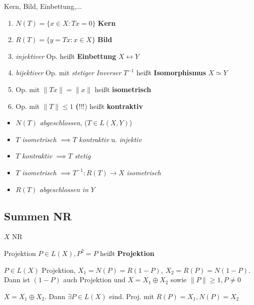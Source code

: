 \begin{definition}{Kern, Bild, Einbettung,...}
  \begin{enumerate}[label = (\roman*)]
    \item $N(T) = \{x \in X: Tx =0\}$ \textbf{Kern}
    \item $R(T) = \{y = Tx: x \in X\}$ \textbf{Bild}
    \item \textit{injektiver} Op. heißt \textbf{Einbettung}
      $X \leftrightarrow Y$
    \item \textit{bijektiver} Op. mit \textit{stetiger Inverser} $T^{-1}$
     heißt \textbf{Isomorphismus} $X \simeq Y$
    \item Op. mit $\|Tx\| = \|x\|$ heißt \textbf{isometrisch}
    \item Op. mit $\|T\| \leq 1$ \textbf(!!!) heißt \textbf{kontraktiv}
  \end{enumerate}
\end{definition}

\begin{bemerkung}
  \begin{itemize}
    \item $N(T)$ \textit{abgeschlossen}, ($T\in L(X,Y)$)
    \item $T$ \textit{isometrisch} $\implies T$ \textit{kontraktiv} u.
      \textit{injektiv}
    \item $T$ \textit{kontraktiv} $\implies T$ \textit{stetig}
    \item $T$ \textit{isometrisch} $\implies T^{-1}:R(T) \to X$
      \textit{isometrisch}
    \item $R(T)$ \textit{abgeschlossen in} $Y$
  \end{itemize}
\end{bemerkung}


\subsection{Summen NR}
  $X$ NR

\begin{definition}{Projektion}
  $P \in L(X), P^2=P$ heißt \textbf{Projektion}
\end{definition}

\begin{lemma}
  $P \in L(X)$ Projektion, $X_1 = N(P) = R(1-P),\ X_2 = R(P) = N(1-P)$.
  Dann ist $(1-P)$ auch Projektion und $X = X_1 \oplus X_2$ sowie
  $\|P\| \geq 1, P \neq 0$
\end{lemma}

\begin{lemma}
  $X = X_1 \oplus X_2$. Dann $\exists P \in L(X)$ eind. Proj. mit
  $R(P) = X_1, N(P) = X_2$
\end{lemma}

